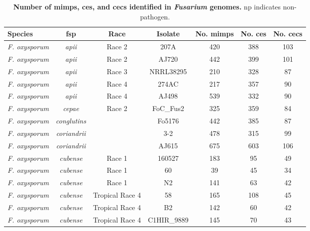 
\begingroup
\setlength{\tabcolsep}{6.1pt} %
\renewcommand{\arraystretch}{0.62}
\setlength\LTcapwidth{\textwidth} %
\setlength\LTleft{0pt}            %
\setlength\LTright{0pt} %
\footnotesize
\begin{longtable}{@{}lcccccc@{}}
\caption[Number of \acp{mimp}, \aclp{ce}, and \aclp{cec} identified in \textit{Fusarium} genomes.]{\textbf{Number of \acfp{mimp}, \acfp{ce}, and \acfp{cec} identified in \textit{Fusarium} genomes.} np indicates non-pathogen.}
\label{tab:CandEffNo}\\
\toprule
\textbf{Species} & \textbf{\acl{fsp}} & \textbf{Race} & \textbf{Isolate} & \textbf{No. \acp{mimp}} & \textbf{No. \acp{ce}} & \textbf{No. \acp{cec}} \\* \midrule
\endhead
%
\bottomrule
\endfoot
%
\endlastfoot
%
\textit{F. oxysporum} & \textit{apii} & Race 2 & 207A & 420 & 388 & 103 \\
\textit{F. oxysporum} & \textit{apii} & Race 2 & AJ720 & 442 & 399 & 101 \\
\textit{F. oxysporum} & \textit{apii} & Race 3 & NRRL38295 & 210 & 328 & 87 \\
\textit{F. oxysporum} & \textit{apii} & Race 4 & 274AC & 217 & 357 & 90 \\
\textit{F. oxysporum} & \textit{apii} & Race 4 & AJ498 & 539 & 332 & 90 \\
\textit{F. oxysporum} & \textit{cepae} & Race 2 & FoC\_Fus2 & 325 & 359 & 84 \\
\textit{F. oxysporum} & \textit{conglutins} &  & Fo5176 & 442 & 385 & 87 \\
\textit{F. oxysporum} & \textit{coriandrii} &  & 3-2 & 478 & 315 & 99 \\
\textit{F. oxysporum} & \textit{coriandrii} &  & AJ615 & 675 & 603 & 106 \\
\textit{F. oxysporum} & \textit{cubense} & Race 1 & 160527 & 183 & 95 & 49 \\
\textit{F. oxysporum} & \textit{cubense} & Race 1 & 60 & 39 & 45 & 34 \\
\textit{F. oxysporum} & \textit{cubense} & Race 1 & N2 & 141 & 63 & 42 \\
\textit{F. oxysporum} & \textit{cubense} & Tropical Race 4 & 58 & 165 & 108 & 45 \\
\textit{F. oxysporum} & \textit{cubense} & Tropical Race 4 & B2 & 142 & 60 & 42 \\
\textit{F. oxysporum} & \textit{cubense} & Tropical Race 4 & C1HIR\_9889 & 145 & 70 & 43 \\

\end{longtable}
